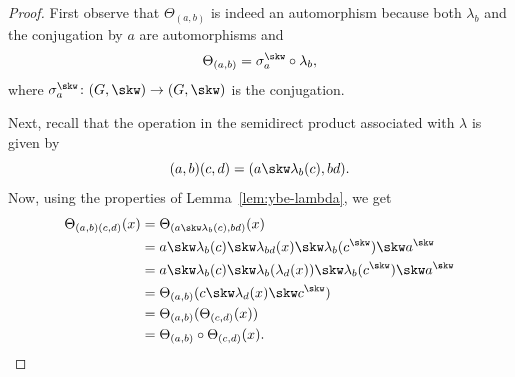 \begin{proof}
    First observe that $\Theta_{(a,b)}$ is indeed an automorphism because both $\lambda_b$ and the conjugation by $a$ are automorphisms and
    $$
        \Theta_{(a,b)}=\sigma_a^\skw\circ\lambda_b,
    $$
    where $\sigma_a^\skw\colon(G,\skw)\to(G,\skw)$ is the conjugation.

    Next, recall that the operation in the semidirect product associated with $\lambda$ is given by
    $$
        (a,b)(c,d) = (a\skw\lambda_b(c),bd).
    $$
    Now, using the properties of Lemma~\ref{lem:ybe-lambda}, we get
    \begin{align*}
        \Theta_{(a,b)(c,d)}(x) &= \Theta_{(a\skw\lambda_b(c),bd)}(x)\\
            &= a\skw\lambda_b(c)\skw\lambda_{bd}(x)
                \skw\lambda_b(c^\skw)\skw a^\skw\\
            &= a\skw\lambda_b(c)\skw\lambda_b(\lambda_d(x))
                \skw\lambda_b(c^\skw)\skw a^\skw\\
            &= \Theta_{(a,b)}(c\skw\lambda_d(x)\skw c^\skw)\\
            &= \Theta_{(a,b)}(\Theta_{(c,d)}(x))\\
            &= \Theta_{(a,b)}\circ\Theta_{(c,d)}(x).
    \end{align*}
\end{proof}

